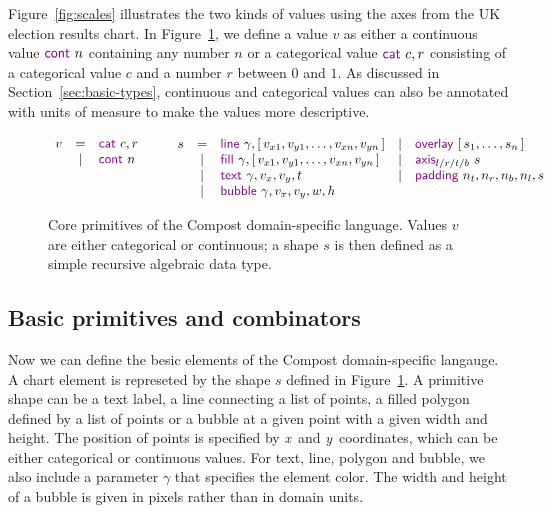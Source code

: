 \documentclass{jfp}
\newcommand{\X}{\emph{x}\ }
\newcommand{\Y}{\emph{y}\ }
\newcommand{\kvd}[1]{\textnormal{\textcolor{kvdclr}{\sffamily #1}}}
\begin{document}
Figure~\ref{fig:scales} illustrates the two kinds of values using the axes from the UK
election results chart. In Figure~\ref{fig:shape}, we define a value $v$ as either a continuous value
$\kvd{cont}~n$ containing any number $n$ or a categorical value $\kvd{cat}~c, r$ consisting
of a categorical value $c$ and a number $r$ between $0$ and $1$. As discussed in
Section~\ref{sec:basic-types}, continuous and categorical values can also be annotated with
units of measure to make the values more descriptive.
%
\begin{figure}
\begin{equation*}
\begin{array}{rcl}
v & = & \kvd{cat}~c, r \\
  & | & \kvd{cont}~n\\[1.25em]
  ~
\end{array}
\qquad
\begin{array}{rclcl}
s & = &\kvd{line}~\gamma, [\,v_{x1}, v_{y1}, \ldots, v_{xn}, v_{yn}\,] & | & \kvd{overlay}~[\,s_1, \ldots, s_n\,]\\
 & | & \kvd{fill}~\gamma, [\,v_{x1}, v_{y1}, \ldots, v_{xn}, v_{yn}\,] & | &\kvd{axis}_{l/r/t/b}~s\\
 & | & \kvd{text}~\gamma, v_x, v_y, t & | &\kvd{padding}~n_t,n_r,n_b,n_l,s\\
 & | & \kvd{bubble}~\gamma, v_x, v_y, w, h
\end{array}
\end{equation*}
\caption{Core primitives of the Compost domain-specific language. Values $v$ are either categorical
  or continuous; a shape $s$ is then defined as a simple recursive algebraic data type.}
\label{fig:shape}
\end{figure}

\subsection{Basic primitives and combinators}
\label{sec:basic-primitives}

Now we can define the besic elements of the Compost domain-specific langauge.
A chart element is represeted by the shape $s$ defined in Figure~\ref{fig:shape}.
A primitive shape can be a text label, a line connecting a list of points, a filled polygon
defined by a list of points or a bubble at a given point with a given width and height.
The position of points is specified by \X and \Y coordinates, which can be either categorical or
continuous values. For text, line, polygon and bubble, we also include a parameter $\gamma$
that specifies the element color. The width and height of a bubble is given in pixels rather than
in domain units.
\end{document}
